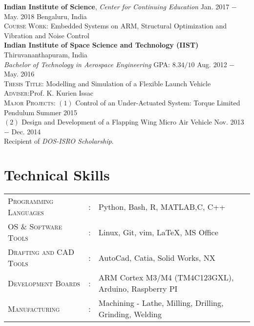 \documentclass[letterpaper,10pt]{article}
\begin{document}
\vspace{5pt}
\noindent \textbf{Indian Institute of Science}, \textit{Center for Continuing Education} \hfill Jan. 2017 $-$ May. 2018  \hfill Bengaluru, India \\
\textsc{Course Work:} Embedded Systems on ARM, Structural Optimization and Vibration and Noise Control \\

\vspace{5pt}
\noindent \textbf{Indian Institute of Space Science and Technology (IIST)} \hfill Thiruvananthapuram, India\\
\textit{Bachelor of Technology in Aerospace Engineering} \hfill \textsc{GPA}: $8.34/10$ \hfill Aug. 2012 $-$ May. 2016 \\
\textsc{Thesis Title}: Modelling and Simulation of a Flexible Launch Vehicle
\hfill \textsc{Adviser}:Prof. K. Kurien Issac \\
\textsc{Major Projects}: $(1)$ Control of an Under-Actuated System: Torque Limited Pendulum \hfill {Summer 2015}\\
$(2)$ Design and Development of a Flapping Wing Micro Air Vehicle \hfill {Nov. 2013 $-$ Dec. 2014}\\
Recipient of \textit{DOS-ISRO Scholarship}.


\section{Technical Skills}
\begin{tabular}{l c l}
	\textsc{Programming Languages}&:& Python, Bash, R, MATLAB,C, C++ \\
	\textsc{OS \& Software Tools}&:& Linux, Git, vim, \LaTeX, MS Office\\
    \textsc{Drafting and CAD Tools}&:& AutoCad, Catia, Solid Works, NX\\
    \textsc{Development Boards}&:& ARM Cortex M3/M4 (TM4C123GXL), Arduino, Raspberry PI\\
	\textsc{Manufacturing}&:& Machining - Lathe, Milling, Drilling, Grinding,
	Welding\\
\end{tabular}
\end{document}
